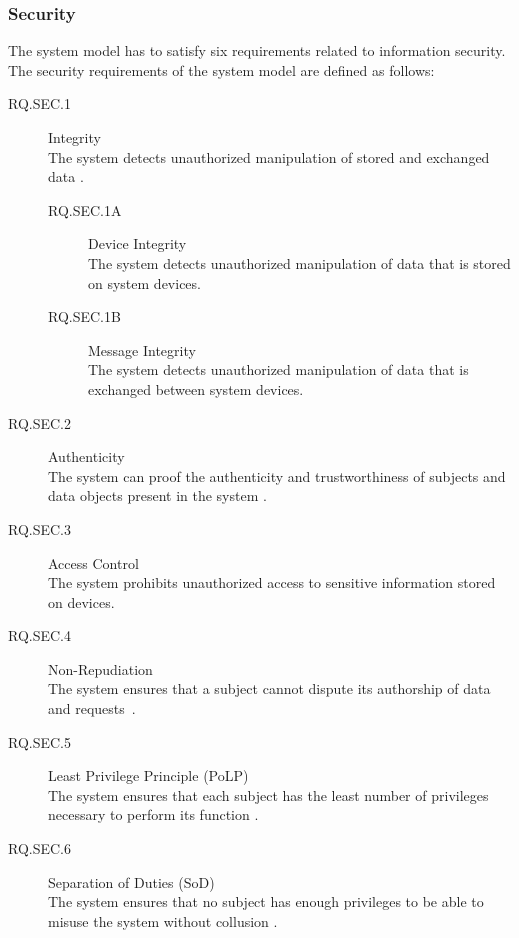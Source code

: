 \subsubsection{Security}
The system model has to satisfy six requirements related to information security.
The security requirements of the system model are defined as follows:
\begin{description}
    \item[RQ.SEC.1] Integrity\\
    The system detects unauthorized manipulation of stored and exchanged data \cite{Eckert2023}.
    \begin{description}
        \item[RQ.SEC.1A] Device Integrity\\
        The system detects unauthorized manipulation of data that is stored on system devices.
        \item[RQ.SEC.1B] Message Integrity\\
        The system detects unauthorized manipulation of data that is exchanged between system devices.
    \end{description}
    \item[RQ.SEC.2] Authenticity\\
    The system can proof the authenticity and trustworthiness of subjects and data objects present in the system \cite{Eckert2023}.
    \item[RQ.SEC.3] Access Control\\
    The system prohibits unauthorized access to sensitive information stored on devices.
    \item[RQ.SEC.4] Non-Repudiation\\
    The system ensures that a subject cannot dispute its authorship of data and requests~\cite{Eckert2023}.
    \item[RQ.SEC.5] Least Privilege Principle (PoLP)\\
    The system ensures that each subject has the least number of privileges necessary to perform its function \cite{JTF2020}.
    \item[RQ.SEC.6] Separation of Duties (SoD)\\
    The system ensures that no subject has enough privileges to be able to misuse the system without collusion \cite{JTF2020}.
\end{description}

